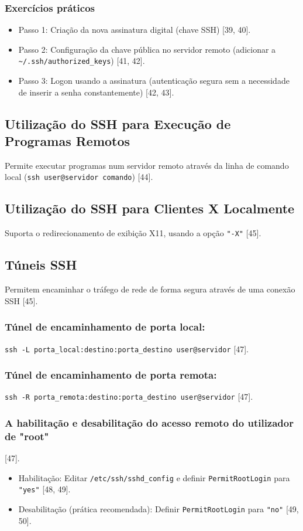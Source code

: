 \documentclass[12pt, a4paper]{article}
\begin{document}
	\subsubsection{Exercícios práticos} %
	\begin{itemize}
		\item Passo 1: Criação da nova assinatura digital (chave SSH) [39, 40].
		\item Passo 2: Configuração da chave pública no servidor remoto (adicionar a \texttt{\textasciitilde/.ssh/authorized\_keys}) [41, 42].
		\item Passo 3: Logon usando a assinatura (autenticação segura sem a necessidade de inserir a senha constantemente) [42, 43].
	\end{itemize}
	
	\subsection{Utilização do SSH para Execução de Programas Remotos} %
	Permite executar programas num servidor remoto através da linha de comando local (\texttt{ssh user@servidor comando}) [44].
	
	\subsection{Utilização do SSH para Clientes X Localmente} %
	Suporta o redirecionamento de exibição X11, usando a opção \texttt{"-X"} [45].
	
	\subsection{Túneis SSH} %
	Permitem encaminhar o tráfego de rede de forma segura através de uma conexão SSH [45].
	\subsubsection{Túnel de encaminhamento de porta local:} \texttt{ssh -L porta\_local:destino:porta\_destino user@servidor} [47].
	\subsubsection{Túnel de encaminhamento de porta remota:} \texttt{ssh -R porta\_remota:destino:porta\_destino user@servidor} [47].
	\subsubsection{A habilitação e desabilitação do acesso remoto do utilizador de "root"} [47].
	\begin{itemize}
		\item Habilitação: Editar \texttt{/etc/ssh/sshd\_config} e definir \texttt{PermitRootLogin} para \texttt{"yes"} [48, 49].
		\item Desabilitação (prática recomendada): Definir \texttt{PermitRootLogin} para \texttt{"no"} [49, 50].
	\end{itemize}
	
\end{document}
